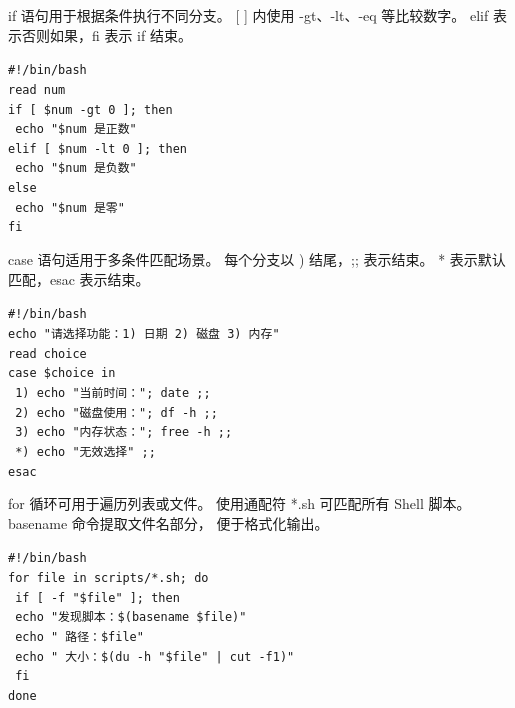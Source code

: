 \documentclass[a4paper, 12pt]{article}
\begin{document}
\begin{tcolorbox}[instancestyle, title=实例9：if条件判断（数字）]
if 语句用于根据条件执行不同分支。
[ ] 内使用 -gt、-lt、-eq 等比较数字。
elif 表示否则如果，fi 表示 if 结束。

\texttt{\#!/bin/bash} \\
\texttt{read num} \\
\texttt{if [ \$num -gt 0 ]; then} \\
\texttt{  echo "\$num 是正数"} \\
\texttt{elif [ \$num -lt 0 ]; then} \\
\texttt{  echo "\$num 是负数"} \\
\texttt{else} \\
\texttt{  echo "\$num 是零"} \\
\texttt{fi}
\end{tcolorbox}

\begin{tcolorbox}[instancestyle, title=实例10：case多分支选择]
case 语句适用于多条件匹配场景。
每个分支以 ) 结尾，;; 表示结束。
* 表示默认匹配，esac 表示结束。

\texttt{\#!/bin/bash} \\
\texttt{echo "请选择功能：1) 日期  2) 磁盘  3) 内存"} \\
\texttt{read choice} \\
\texttt{case \$choice in} \\
\texttt{  1) echo "当前时间："; date ;;} \\
\texttt{  2) echo "磁盘使用："; df -h ;;} \\
\texttt{  3) echo "内存状态："; free -h ;;} \\
\texttt{  *) echo "无效选择" ;;} \\
\texttt{esac}
\end{tcolorbox}

\begin{tcolorbox}[instancestyle, title=实例11：for循环遍历文件]
for 循环可用于遍历列表或文件。
使用通配符 *.sh 可匹配所有 Shell 脚本。
basename 命令提取文件名部分，
便于格式化输出。

\texttt{\#!/bin/bash} \\
\texttt{for file in scripts/*.sh; do} \\
\texttt{  if [ -f "\$file" ]; then} \\
\texttt{    echo "发现脚本：\$(basename \$file)"} \\
\texttt{    echo "  路径：\$file"} \\
\texttt{    echo "  大小：\$(du -h "\$file" | cut -f1)"} \\
\texttt{  fi} \\
\texttt{done}
\end{tcolorbox}
\end{document}
